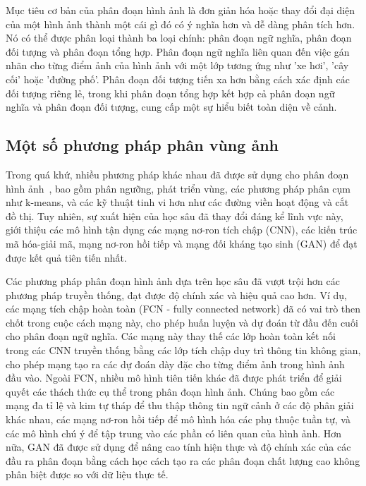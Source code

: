 Mục tiêu cơ bản của phân đoạn hình ảnh là đơn giản hóa hoặc thay đổi đại diện của một hình ảnh thành một cái gì đó có ý nghĩa hơn và dễ dàng phân tích hơn. Nó có thể được phân loại thành ba loại chính: phân đoạn ngữ nghĩa, phân đoạn đối tượng và phân đoạn tổng hợp. Phân đoạn ngữ nghĩa liên quan đến việc gán nhãn cho từng điểm ảnh của hình ảnh với một lớp tương ứng như 'xe hơi', 'cây cối' hoặc 'đường phố'. Phân đoạn đối tượng tiến xa hơn bằng cách xác định các đối tượng riêng lẻ, trong khi phân đoạn tổng hợp kết hợp cả phân đoạn ngữ nghĩa và phân đoạn đối tượng, cung cấp một sự hiểu biết toàn diện về cảnh.



\subsection{Một số phương pháp phân vùng ảnh}

Trong quá khứ, nhiều phương pháp khác nhau đã được sử dụng cho phân đoạn hình ảnh~\cite{minaee2021image}, bao gồm phân ngưỡng, phát triển vùng, các phương pháp phân cụm như k-means, và các kỹ thuật tinh vi hơn như các đường viền hoạt động và cắt đồ thị. Tuy nhiên, sự xuất hiện của học sâu đã thay đổi đáng kể lĩnh vực này, giới thiệu các mô hình tận dụng các mạng nơ-ron tích chập (CNN), các kiến trúc mã hóa-giải mã, mạng nơ-ron hồi tiếp và mạng đối kháng tạo sinh (GAN) để đạt được kết quả tiên tiến nhất. 

Các phương pháp phân đoạn hình ảnh dựa trên học sâu đã vượt trội hơn các phương pháp truyền thống, đạt được độ chính xác và hiệu quả cao hơn. Ví dụ, các mạng tích chập hoàn toàn (FCN - fully connected network) đã có vai trò then chốt trong cuộc cách mạng này, cho phép huấn luyện và dự đoán từ đầu đến cuối cho phân đoạn ngữ nghĩa. Các mạng này thay thế các lớp hoàn toàn kết nối trong các CNN truyền thống bằng các lớp tích chập duy trì thông tin không gian, cho phép mạng tạo ra các dự đoán dày đặc cho từng điểm ảnh trong hình ảnh đầu vào. Ngoài FCN, nhiều mô hình tiên tiến khác đã được phát triển để giải quyết các thách thức cụ thể trong phân đoạn hình ảnh. Chúng bao gồm các mạng đa tỉ lệ và kim tự tháp để thu thập thông tin ngữ cảnh ở các độ phân giải khác nhau, các mạng nơ-ron hồi tiếp để mô hình hóa các phụ thuộc tuần tự, và các mô hình chú ý để tập trung vào các phần có liên quan của hình ảnh. Hơn nữa, GAN đã được sử dụng để nâng cao tính hiện thực và độ chính xác của các đầu ra phân đoạn bằng cách học cách tạo ra các phân đoạn chất lượng cao không phân biệt được so với dữ liệu thực tế.


